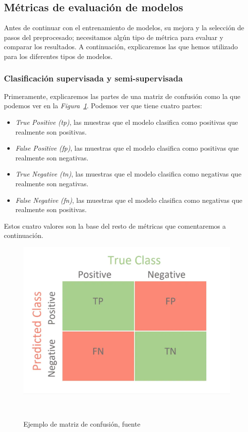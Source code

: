 \subsection{Métricas de evaluación de modelos}

Antes de continuar con el entrenamiento de modelos, su mejora y la selección de pasos del preprocesado; necesitamos algún tipo de métrica para evaluar y comparar los resultados. A continuación, explicaremos las que hemos utilizado para los diferentes tipos de modelos.

\subsubsection{Clasificación supervisada y semi-supervisada}

Primeramente, explicaremos las partes de una matriz de confusión como la que podemos ver en la \textit{Figura\ \ref{fig:confusion-matrix-example}}. Podemos ver que tiene cuatro partes:

\begin{itemize}
    \item \textit{True Positive (tp)}, las muestras que el modelo clasifica como positivas que realmente son positivas.
    \item \textit{False Positive (fp)}, las muestras que el modelo clasifica como positivas que realmente son negativas.
    \item \textit{True Negative (tn)}, las muestras que el modelo clasifica como negativas que realmente son negativas.
    \item \textit{False Negative (fn)}, las muestras que el modelo clasifica como negativas que realmente son positivas.
\end{itemize}

Estos cuatro valores son la base del resto de métricas que comentaremos a continuación.

\begin{figure}[!ht]
    \centering
    \includegraphics[width=0.7\linewidth]{media/images/confusion-matrix-example.png}
    \caption{Ejemplo de matriz de confusión, fuente\ \cite{Confusio71:online}}\ \label{fig:confusion-matrix-example}
\end{figure}

